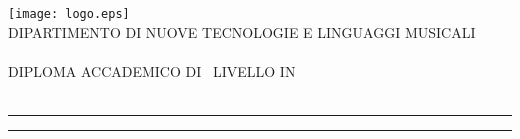 
\begin{titlepage}

\areaset{450pt}{784pt}

  \begin{center}
    {\LARGE
      \texttt{[image: logo.eps]} \\[0.5cm]

      {\normalsize{DIPARTIMENTO DI NUOVE TECNOLOGIE E LINGUAGGI MUSICALI}} \\[-0.2cm]
      {} \\

      {\normalsize{DIPLOMA ACCADEMICO DI \myLevel~LIVELLO IN}} \\[-0.2cm]
      {\spacedlowsmallcaps{\myCourse}} \\[1cm]

      {\huge{\spacedlowsmallcaps{\myName}}}
      \vspace{-0.5cm}
      \par\noindent\rule{\textwidth}{0.4pt}\vspace{0.3cm}
		{\Huge{\color{bbari}\spacedallcaps{\myTitle}}}
      \par\noindent\rule{\textwidth}{0.4pt}\vspace{0.3cm}}
        {\Large{\spacedlowsmallcaps{\mySubTitle}}} \\[.2cm]
	\vfill
	


\end{center}
\end{titlepage}
